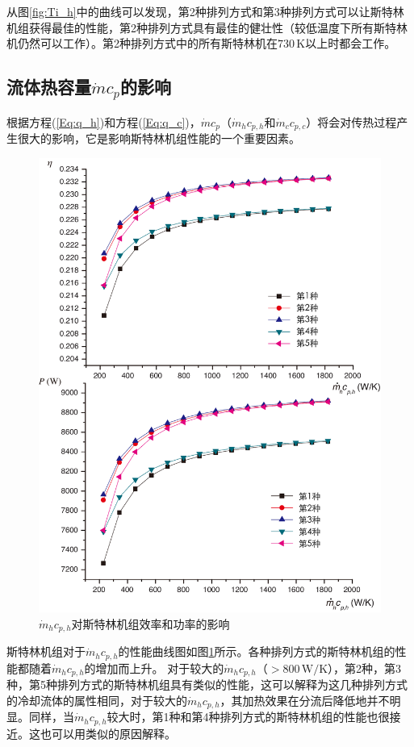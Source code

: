 从图\ref{fig:Ti_h}中的曲线可以发现，第2种排列方式和第3种排列方式可以让斯特林机组获得最佳的性能，第2种排列方式具有最佳的健壮性（较低温度下所有斯特林机仍然可以工作）。第2种排列方式中的所有斯特林机在$730\,\mathrm{K}$以上时都会工作。

\subsection{流体热容量$\dot{m}c_p$的影响}

根据方程(\ref{Eq:q_h})和方程(\ref{Eq:q_c})，$\dot{m}c_p$（$\dot{m}_hc_{p,h}$和$\dot{m}_cc_{p,c}$）将会对传热过程产生很大的影响，它是影响斯特林机组性能的一个重要因素。

\noindent \begin{figure}[htbp]
\begin{center}
	\includegraphics[width = 0.7\columnwidth]{fig/qm_hcp_h}
	\caption{$\dot{m}_hc_{p,h}$对斯特林机组效率和功率的影响}
	\label{fig:qm_hcp_h}
\end{center}
\end{figure}

斯特林机组对于$\dot{m}_hc_{p,h}$的性能曲线图如图\ref{fig:qm_hcp_h}所示。各种排列方式的斯特林机组的性能都随着$\dot{m}_hc_{p,h}$的增加而上升。
对于较大的$\dot{m}_hc_{p,h}$（$> 800\,\mathrm{W/K}$），第2种，第3种，第5种排列方式的斯特林机组具有类似的性能，这可以解释为这几种排列方式的冷却流体的属性相同，对于较大的$\dot{m}_hc_{p,h}$，其加热效果在分流后降低地并不明显。同样，当$\dot{m}_hc_{p,h}$较大时，第1种和第4种排列方式的斯特林机组的性能也很接近。这也可以用类似的原因解释。

